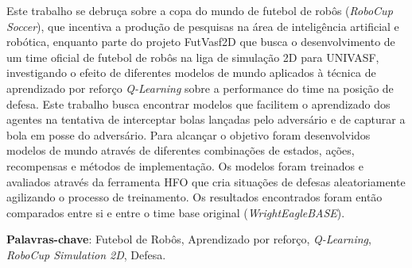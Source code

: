 


\setlength{\absparsep}{18pt} %
\begin{resumo}


Este trabalho se debruça sobre a copa do mundo de futebol de robôs
(\textit{RoboCup Soccer}), que incentiva a produção de pesquisas na área de
inteligência artificial e robótica, enquanto parte do projeto FutVasf2D que
busca o desenvolvimento de um time oficial de futebol de robôs na liga de
simulação 2D para UNIVASF, investigando o efeito de diferentes modelos
de mundo aplicados à técnica de aprendizado por reforço \textit{Q-Learning}
sobre a performance do time na posição de defesa. Este trabalho busca encontrar
modelos que facilitem o aprendizado dos agentes na tentativa de interceptar
bolas lançadas pelo adversário e de capturar a bola em posse do adversário. Para
alcançar o objetivo foram desenvolvidos modelos de mundo através de diferentes
combinações de estados, ações, recompensas e métodos de implementação. Os
modelos foram treinados e avaliados através da ferramenta HFO que cria situações
de defesas aleatoriamente agilizando o processo de treinamento. Os resultados
encontrados foram então comparados entre si e entre o time base original
(\textit{WrightEagleBASE}).


 \textbf{Palavras-chave}: Futebol de Robôs, Aprendizado por reforço, \textit{Q-Learning}, \textit{RoboCup Simulation 2D}, Defesa.

\end{resumo}

